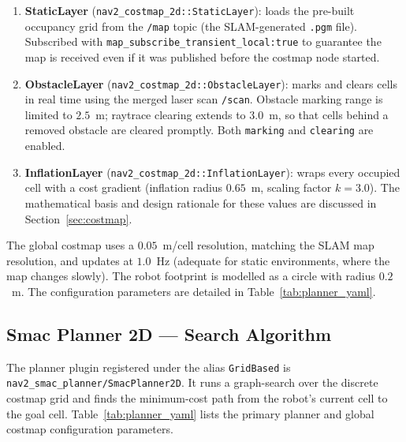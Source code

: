 \begin{enumerate}
    \item \textbf{StaticLayer} (\texttt{nav2\_costmap\_2d::}\allowbreak\texttt{StaticLayer}): loads the pre-built occupancy grid from the \texttt{/map} topic (the SLAM-generated \texttt{.pgm} file). Subscribed with \texttt{map\_subscribe\_}\allowbreak\texttt{transient\_local:}\allowbreak\texttt{true} to guarantee the map is received even if it was published before the costmap node started.
    \item \textbf{ObstacleLayer} (\texttt{nav2\_costmap\_2d::}\allowbreak\texttt{ObstacleLayer}): marks and clears cells in real time using the merged laser scan \texttt{/scan}. Obstacle marking range is limited to $2.5$~m; raytrace clearing extends to $3.0$~m, so that cells behind a removed obstacle are cleared promptly. Both \texttt{marking} and \texttt{clearing} are enabled.
    \item \textbf{InflationLayer} (\texttt{nav2\_costmap\_2d::}\allowbreak\texttt{InflationLayer}): wraps every occupied cell with a cost gradient (inflation radius $0.65$~m, scaling factor $k=3.0$). The mathematical basis and design rationale for these values are discussed in Section~\ref{sec:costmap}.
\end{enumerate}

The global costmap uses a $0.05$~m/cell resolution, matching the SLAM map resolution, and updates at $1.0$~Hz (adequate for static environments, where the map changes slowly). The robot footprint is modelled as a circle with radius $0.2$~m. The configuration parameters are detailed in Table~\ref{tab:planner_yaml}.

\subsection*{Smac Planner 2D --- Search Algorithm}

The planner plugin registered under the alias \texttt{GridBased} is \texttt{nav2\_smac\_planner/SmacPlanner2D}. It runs a graph-search over the discrete costmap grid and finds the minimum-cost path from the robot's current cell to the goal cell. Table~\ref{tab:planner_yaml} lists the primary planner and global costmap configuration parameters.

